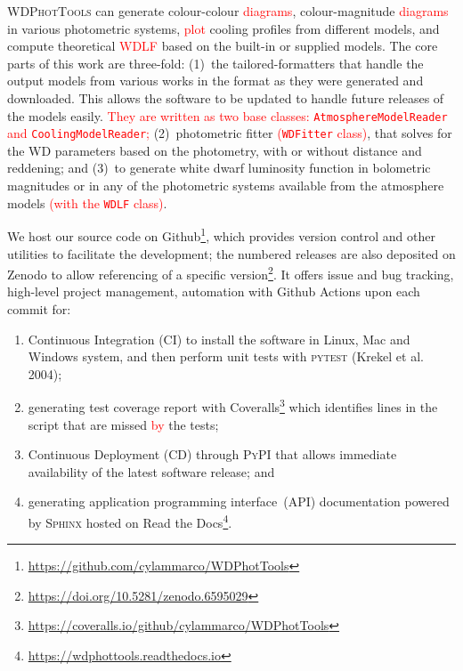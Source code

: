 \documentclass[fleqn,usenatbib]{rasti}
\begin{document}
\textsc{WDPhotTools} can generate colour-colour \textcolor{red}{diagrams},
colour-magnitude \textcolor{red}{diagrams} in various photometric systems,
\textcolor{red}{plot} cooling profiles from different models, and compute
theoretical \textcolor{red}{WDLF} based on the built-in or supplied models.
The core parts of this work are three-fold: (1)~the tailored-formatters that
handle the output models from various works in the format as they were
generated and downloaded. This allows the software to be updated to handle
future releases of the models easily. \textcolor{red}{They are written as
two base classes: \texttt{AtmosphereModelReader} and
\texttt{CoolingModelReader};} (2)~photometric fitter
\textcolor{red}{(\texttt{WDFitter} class)}, that solves for
the WD parameters based on the photometry, with or without distance and
reddening; and (3)~to generate white dwarf luminosity function in
bolometric magnitudes or in any of the photometric systems available from the
atmosphere models \textcolor{red}{(with the \texttt{WDLF} class)}.

We host our source code on Github\footnote{\url{https://github.com/cylammarco/WDPhotTools}},
which provides version control and other utilities to facilitate the
development; the numbered releases are also deposited on Zenodo to allow
referencing of a specific version\footnote{\url{https://doi.org/10.5281/zenodo.6595029}}.
It offers issue and bug tracking, high-level project management,
automation with Github Actions upon each commit for:

\begin{enumerate}
    \item Continuous Integration (CI) to install the software in Linux, Mac
    and Windows system, and then perform unit tests with \textsc{pytest}
    (Krekel et al. 2004);
    \item generating test coverage report with Coveralls\footnote{\url{
    https://coveralls.io/github/cylammarco/WDPhotTools}}
    which identifies
    lines in the script that are missed \textcolor{red}{by} the tests;
    \item Continuous Deployment (CD) through \textsc{PyPI} that allows
    immediate availability of the latest software release; and
    \item generating application programming interface~(API) documentation
    powered by \textsc{Sphinx} hosted on
    Read the Docs\footnote{\url{https://wdphottools.readthedocs.io}}.
\end{enumerate}
\end{document}
